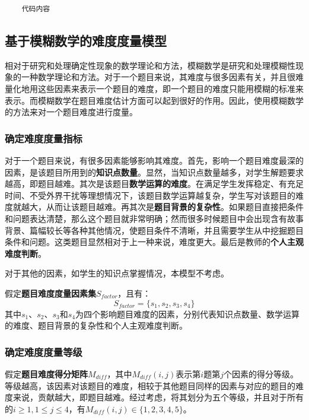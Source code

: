 \begin{mgCodeBlock}
\begin{verbatim}
    代码内容
\end{verbatim}
\end{mgCodeBlock}

\subsection{基于模糊数学的难度度量模型}

相对于研究和处理确定性现象的数学理论和方法，模糊数学是研究和处理模糊性现象的一种数学理论和方法\cite{}。对于一个题目来说，其难度与很多因素有关，并且很难量化地用这些因素来表示一个题目的难度，即一个题目的难度只能用模糊的标准来表示。而模糊数学在题目难度估计方面可以起到很好的作用。因此，使用模糊数学的方法来对一个题目难度进行度量。

\subsubsection{确定难度度量指标}

对于一个题目来说，有很多因素能够影响其难度。首先，影响一个题目难度最深的因素，是该题目所用到的\textbf{知识点数量}。显然，当知识点数量越多，对学生解题要求越高，即题目越难。其次是该题目\textbf{数学运算的难度}。在满足学生发挥稳定、有充足时间、不受外界干扰等理想情况下，该题目数学运算越复杂，学生写对该题目的难度就越大，从而让该题目越难。再其次是\textbf{题目背景的复杂性}。如果题目直接把条件和问题表达清楚，那么这个题目就非常明确；然而很多时候题目中会出现含有故事背景、篇幅较长等各种其他情况，使题目条件不清晰，并且需要学生从中挖掘题目条件和问题。这类题目显然相对于上一种来说，难度更大。最后是教师的\textbf{个人主观难度判断}。

对于其他的因素，如学生的知识点掌握情况，本模型不考虑。

假定\textbf{题目难度度量因素集}$S_{factor}$，且有：
$$S_{factor} = \{ s_1, s_2, s_3, s_4 \}$$
其中$s_1$、$s_2$、$s_3$和$s_4$为四个影响题目难度的因素，分别代表知识点数量、数学运算的难度、题目背景的复杂性和个人主观难度判断。

\subsubsection{确定难度度量等级}

假定\textbf{题目难度得分矩阵}$M_{diff}$，其中$M_{diff}(i, j)$表示第$i$题第$j$个因素的得分等级。等级越高，该因素对该题目的难度，相较于其他题目同样的因素与对应的题目的难度来说，贡献越大，即题目越难。经过考虑，将其划分为五个等级，并且对于所有的$i \geq 1, 1 \leq j \leq 4$，有$M_{diff}(i, j)\in \{1, 2, 3, 4, 5\}$。

